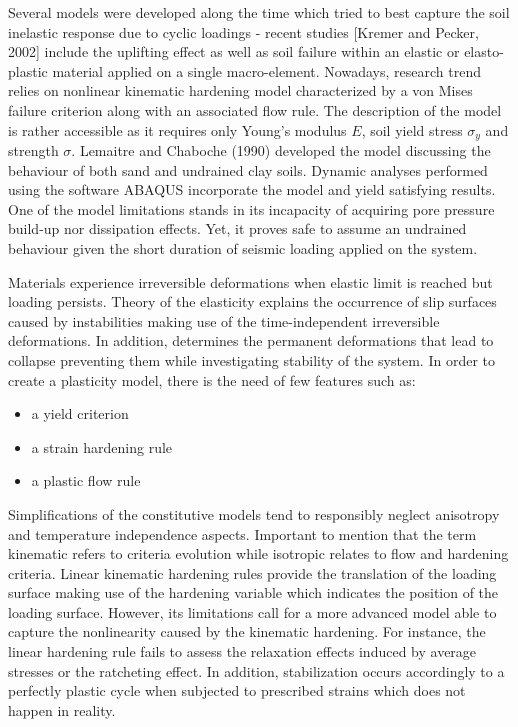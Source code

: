 \documentclass[10pt,a4paper]{report}
\begin{document}
Several models were developed along the time which tried to best capture the soil inelastic response due to cyclic loadings - recent studies [Kremer and Pecker, 2002] include the uplifting effect as well as soil failure within an elastic or elasto-plastic material applied on a single macro-element. Nowadays, research trend relies on nonlinear kinematic hardening model characterized by a von Mises failure criterion along with an associated flow rule. The description of the model is rather accessible as it requires only Young's modulus $E$, soil yield stress $\sigma_y$ and strength $\sigma$. Lemaitre and Chaboche (1990)\cite{lemaitre1994mechanics} developed the model discussing the behaviour of both sand and undrained clay soils. Dynamic analyses performed using the software ABAQUS incorporate the model and yield satisfying results. One of the model limitations stands in its incapacity of acquiring pore pressure build-up nor dissipation effects. Yet, it proves safe to assume an undrained behaviour given the short duration of seismic loading applied on the system.   

Materials experience irreversible deformations when elastic limit is reached but loading persists. Theory of the elasticity explains the occurrence of slip surfaces caused by instabilities making use of the time-independent irreversible deformations. In addition, determines the permanent deformations that lead to collapse preventing them while investigating stability of the system. 
In order to create a plasticity model, there is the need of few features such as:
\begin{itemize}
	\centering
	\item a yield criterion\
	\item a strain hardening rule\
	\item a plastic flow rule\
\end{itemize}

Simplifications of the constitutive models tend to responsibly neglect anisotropy and temperature independence aspects. Important to mention that the term kinematic refers to criteria evolution while isotropic relates to flow and hardening criteria. Linear kinematic hardening rules provide the translation of the loading surface making use of the hardening variable which indicates the position of the loading surface. However, its limitations call for a more advanced model able to capture the nonlinearity caused by the kinematic hardening. For instance, the linear hardening rule fails to assess the relaxation effects induced by average stresses or the ratcheting effect. In addition, stabilization occurs accordingly to a perfectly plastic cycle when subjected to prescribed strains which does not happen in reality.
\end{document}
